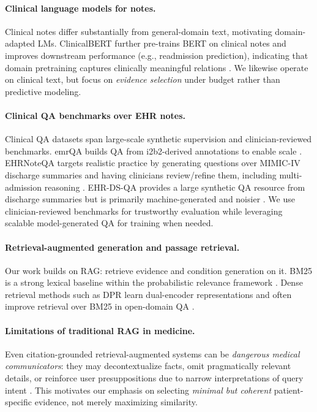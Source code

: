 \paragraph{Clinical language models for notes.}
Clinical notes differ substantially from general-domain text, motivating domain-adapted LMs. ClinicalBERT further pre-trains BERT on clinical notes and improves downstream performance (e.g., readmission prediction), indicating that domain pretraining captures clinically meaningful relations \citep{huang2019clinicalbert}. We likewise operate on clinical text, but focus on \emph{evidence selection} under budget rather than predictive modeling.

\paragraph{Clinical QA benchmarks over EHR notes.}
Clinical QA datasets span large-scale synthetic supervision and clinician-reviewed benchmarks. emrQA builds QA from i2b2-derived annotations to enable scale \citep{pampari2018emrqa}. EHRNoteQA targets realistic practice by generating questions over MIMIC-IV discharge summaries and having clinicians review/refine them, including multi-admission reasoning \citep{kweon2024ehrnoteqa}. EHR-DS-QA provides a large synthetic QA resource from discharge summaries but is primarily machine-generated and noisier \citep{kotschenreuther2024ehrdsqa}. We use clinician-reviewed benchmarks for trustworthy evaluation while leveraging scalable model-generated QA for training when needed.

\paragraph{Retrieval-augmented generation and passage retrieval.}
Our work builds on RAG: retrieve evidence and condition generation on it. BM25 is a strong lexical baseline within the probabilistic relevance framework \citep{robertson2009bm25}. Dense retrieval methods such as DPR learn dual-encoder representations and often improve retrieval over BM25 in open-domain QA \citep{karpukhin2020dpr}.

\paragraph{Limitations of traditional RAG in medicine.}
Even citation-grounded retrieval-augmented systems can be \emph{dangerous medical communicators}: they may decontextualize facts, omit pragmatically relevant details, or reinforce user presuppositions due to narrow interpretations of query intent \citep{wong2025ragdanger}. This motivates our emphasis on selecting \emph{minimal but coherent} patient-specific evidence, not merely maximizing similarity.

